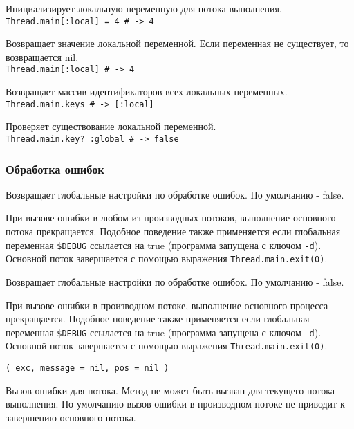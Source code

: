 \begin{methodlist}
  Инициализирует локальную переменную для потока выполнения.
  \\\verb!Thread.main[:local] = 4 # -> 4!
 
  Возвращает значение локальной переменной. Если переменная не существует, то возвращается nil.
  \\\verb!Thread.main[:local] # -> 4!
 
  Возвращает массив идентификаторов всех локальных переменных.
  \\\verb!Thread.main.keys # -> [:local]!
 
  Проверяет существование локальной переменной.
  \\\verb!Thread.main.key? :global # -> false!
\end{methodlist}

\subsubsection*{Обработка ошибок}

\begin{methodlist}
  Возвращает глобальные настройки по обработке ошибок. По умолчанию - false. 
 
  При вызове ошибки в любом из производных потоков, выполнение основного потока прекращается. Подобное поведение также применяется если глобальная переменная \verb!$DEBUG! ссылается на true (программа запущена с ключом \verb!-d!). Основной поток завершается с помощью выражения \verb!Thread.main.exit(0)!. 

  Возвращает глобальные настройки по обработке ошибок. По умолчанию - false. 
 
  При вызове ошибки в производном потоке, выполнение основного процесса прекращается. Подобное поведение также применяется если глобальная переменная \verb!$DEBUG! ссылается на true (программа запущена с ключом \verb!-d!). Основной поток завершается с помощью выражения \verb!Thread.main.exit(0)!.

  \verb!( exc, message = nil, pos = nil )!

  Вызов ошибки для потока. Метод не может быть вызван для текущего потока выполнения. По умолчанию вызов ошибки в производном потоке не приводит к завершению основного потока.
\end{methodlist}


